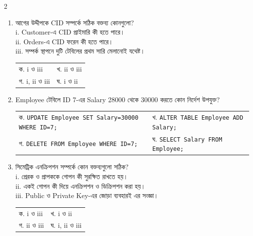 \begin{multicols}{2}
\begin{enumerate}[resume]
\vspace{1pt}
\item \begin{minipage}[t]{\linewidth}
আগের উদ্দীপকে CID সম্পর্কে সঠিক বক্তব্য কোনগুলো?\\ i. Customer-এ CID প্রাইমারি কী হতে পারে।\\ ii. Orders-এ CID ফরেন কী হতে পারে।\\ iii. সম্পর্ক স্থাপনে দুটি টেবিলের প্রথম সারি মেলানোই যথেষ্ট।
\par
\begin{tabularx}{\linewidth}{@{}X X@{}}
ক. i ও iii & খ. ii ও iii \\
গ. i, ii ও iii & ঘ. i ও ii \\
\end{tabularx}
\end{minipage}
\vspace{1pt}
\item \begin{minipage}[t]{\linewidth}
Employee টেবিলে ID 7-এর Salary 28000 থেকে 30000 করতে কোন নির্দেশ উপযুক্ত?
\par
\begin{tabularx}{\linewidth}{@{}X X@{}}
ক. \texttt{UPDATE Employee SET Salary=30000 WHERE ID=7;} & খ. \texttt{ALTER TABLE Employee ADD Salary;} \\
গ. \texttt{DELETE FROM Employee WHERE ID=7;} & ঘ. \texttt{SELECT Salary FROM Employee;} \\
\end{tabularx}
\end{minipage}
\vspace{1pt}
\item \begin{minipage}[t]{\linewidth}
সিমেট্রিক এনক্রিপশন সম্পর্কে কোন বক্তব্যগুলো সঠিক?\\ i. প্রেরক ও প্রাপককে গোপন কী সুরক্ষিত রাখতে হয়।\\ ii. একই গোপন কী দিয়ে এনক্রিপশন ও ডিক্রিপশন করা হয়।\\ iii. Public ও Private Key-এর জোড়া ব্যবহারই এর সংজ্ঞা।
\par
\begin{tabularx}{\linewidth}{@{}X X@{}}
ক. i ও iii & খ. i ও ii \\
গ. ii ও iii & ঘ. i, ii ও iii \\
\end{tabularx}
\end{minipage}
\vspace{1pt}
\end{enumerate}
\end{multicols}
